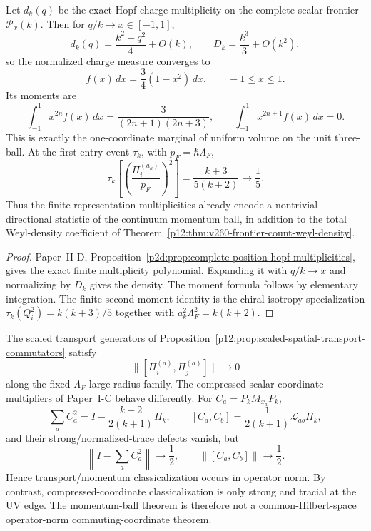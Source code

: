\documentclass[12pt,a4paper]{article}
\begin{document}
\begin{theorem}
\label{p12:thm:v261-hopf-directional-momentum-ball-marginal}
Let \(d_k(q)\) be the exact Hopf-charge multiplicity on the complete scalar
frontier \(\mathcal P_x(k)\).  Then for \(q/k\to x\in[-1,1]\),
\[
 d_k(q)=\frac{k^2-q^2}{4}+O(k),
 \qquad
 D_k=\frac{k^3}{3}+O(k^2),
\]
so the normalized charge measure converges to
\[
 \boxed{f(x)\,dx=\frac34(1-x^2)\,dx,\qquad -1\le x\le1.}
\]
Its moments are
\[
 \boxed{
 \int_{-1}^{1}x^{2n}f(x)\,dx
 =\frac{3}{(2n+1)(2n+3)},
 \qquad
 \int_{-1}^{1}x^{2n+1}f(x)\,dx=0.}
\]
This is exactly the one-coordinate marginal of uniform volume on the unit
three-ball.  At the first-entry event \(\tau_k\), with
\(p_F=\hbar\Lambda_F\),
\[
 \boxed{
 \tau_k\!\left[
 \left(\frac{\Pi_i^{(a_k)}}{p_F}\right)^2\right]
 =\frac{k+3}{5(k+2)}\longrightarrow\frac15.}
\]
Thus the finite representation multiplicities already encode a nontrivial
directional statistic of the continuum momentum ball, in addition to the
total Weyl-density coefficient of
Theorem~\ref{p12:thm:v260-frontier-count-weyl-density}.
\end{theorem}

\begin{proof}
Paper~II-D, Proposition~\ref{p2d:prop:complete-position-hopf-multiplicities},
gives the exact finite multiplicity polynomial.  Expanding it with
\(q/k\to x\) and normalizing by \(D_k\) gives the density.  The moment formula
follows by elementary integration.  The finite second-moment identity is the
chiral-isotropy specialization
\(\tau_k(Q_i^2)=k(k+3)/5\) together with
\(a_k^2\Lambda_F^2=k(k+2)\).
\end{proof}

\begin{remark}
\label{p12:rem:v261-coordinate-versus-transport-classicalization}
The scaled transport generators of
Proposition~\ref{p12:prop:scaled-spatial-transport-commutators} satisfy
\[
 \|[\Pi_i^{(a)},\Pi_j^{(a)}]\|\longrightarrow0
\]
along the fixed-\(\Lambda_F\) large-radius family.  The compressed scalar
coordinate multipliers of Paper~I-C behave differently.  For
\(C_a=P_kM_{x_a}P_k\),
\[
 \sum_aC_a^2
 =I-\frac{k+2}{2(k+1)}\Pi_k,
 \qquad
 [C_a,C_b]=\frac1{2(k+1)}\mathcal L_{ab}\Pi_k,
\]
and their strong/normalized-trace defects vanish, but
\[
 \boxed{
 \left\|I-\sum_aC_a^2\right\|\longrightarrow\frac12,
 \qquad
 \|[C_a,C_b]\|\longrightarrow\frac12.}
\]
Hence transport/momentum classicalization occurs in operator norm.
By contrast, compressed-coordinate classicalization is only strong and
tracial at the UV edge. The momentum-ball theorem is therefore not a
common-Hilbert-space operator-norm commuting-coordinate theorem.
\end{remark}
\end{document}
